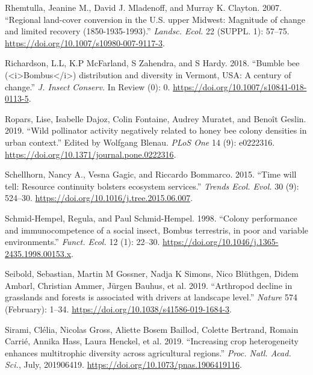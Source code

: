 \documentclass[11pt,]{article}
\begin{document}
\leavevmode\hypertarget{ref-Rhemtulla2007a}{}%
Rhemtulla, Jeanine M., David J. Mladenoff, and Murray K. Clayton. 2007.
``Regional land-cover conversion in the U.S. upper Midwest: Magnitude of
change and limited recovery (1850-1935-1993).'' \emph{Landsc. Ecol.} 22
(SUPPL. 1): 57--75. \url{https://doi.org/10.1007/s10980-007-9117-3}.

\leavevmode\hypertarget{ref-Richardson2018}{}%
Richardson, L.L, K.P McFarland, S Zahendra, and S Hardy. 2018. ``Bumble
bee (\textless{}i\textgreater{}Bombus\textless{}/i\textgreater{})
distribution and diversity in Vermont, USA: A century of change.''
\emph{J. Insect Conserv.} In Review (0): 0.
\url{https://doi.org/10.1007/s10841-018-0113-5}.

\leavevmode\hypertarget{ref-Ropars2019}{}%
Ropars, Lise, Isabelle Dajoz, Colin Fontaine, Audrey Muratet, and Benoît
Geslin. 2019. ``Wild pollinator activity negatively related to honey bee
colony densities in urban context.'' Edited by Wolfgang Blenau.
\emph{PLoS One} 14 (9): e0222316.
\url{https://doi.org/10.1371/journal.pone.0222316}.

\leavevmode\hypertarget{ref-Schellhorn2015c}{}%
Schellhorn, Nancy A., Vesna Gagic, and Riccardo Bommarco. 2015. ``Time
will tell: Resource continuity bolsters ecosystem services.''
\emph{Trends Ecol. Evol.} 30 (9): 524--30.
\url{https://doi.org/10.1016/j.tree.2015.06.007}.

\leavevmode\hypertarget{ref-Schmid-Hempel1998a}{}%
Schmid-Hempel, Regula, and Paul Schmid-Hempel. 1998. ``Colony
performance and immunocompetence of a social insect, Bombus terrestris,
in poor and variable environments.'' \emph{Funct. Ecol.} 12 (1): 22--30.
\url{https://doi.org/10.1046/j.1365-2435.1998.00153.x}.

\leavevmode\hypertarget{ref-Seibold2019}{}%
Seibold, Sebastian, Martin M Gossner, Nadja K Simons, Nico Blüthgen,
Didem Ambarl, Christian Ammer, Jürgen Bauhus, et al. 2019. ``Arthropod
decline in grasslands and forests is associated with drivers at
landscape level.'' \emph{Nature} 574 (February): 1--34.
\url{https://doi.org/10.1038/s41586-019-1684-3}.

\leavevmode\hypertarget{ref-Sirami2019}{}%
Sirami, Clélia, Nicolas Gross, Aliette Bosem Baillod, Colette Bertrand,
Romain Carrié, Annika Hass, Laura Henckel, et al. 2019. ``Increasing
crop heterogeneity enhances multitrophic diversity across agricultural
regions.'' \emph{Proc. Natl. Acad. Sci.}, July, 201906419.
\url{https://doi.org/10.1073/pnas.1906419116}.
\end{document}
